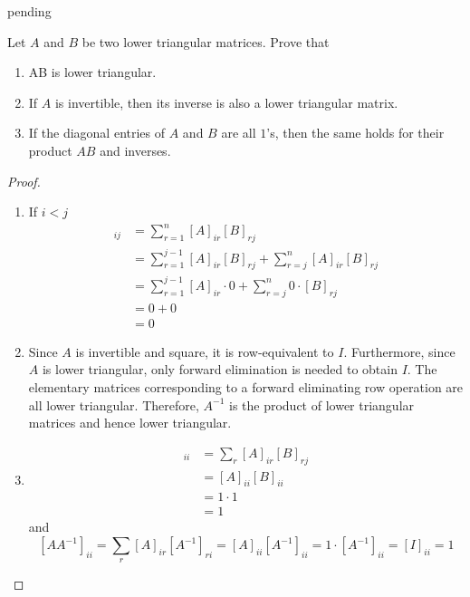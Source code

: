 \begin{problem} \label{P.1.24}
    pending
\end{problem}

\begin{problem} \label{P.1.25}
    Let \( A \) and \( B \) be two lower triangular matrices. Prove that
    \begin{enumerate}
        \item AB is lower triangular.
        
        \item If \( A \) is invertible, then its inverse is also a lower triangular matrix.
        
        \item If the diagonal entries of \( A \) and \( B \) are all \(1\)'s, then the same holds for their product \( AB \) and inverses.
    \end{enumerate}
    
    \begin{proof}
        \begin{enumerate}
            \item If \( i < j \)
            \begin{align*}
                [AB]_{ij} &= \sum_{r=1}^n [A]_{ir}[B]_{rj} \\
                &= \sum_{r=1}^{j-1}[A]_{ir}[B]_{rj} + \sum_{r=j}^n [A]_{ir}[B]_{rj} \\
                &= \sum_{r=1}^{j-1} [A]_{ir}\cdot 0 + \sum_{r=j}^n 0 \cdot [B]_{rj} \\
                &= 0 + 0 \\
                &= 0
            \end{align*}
            
            \item Since \( A \) is invertible and square, it is row-equivalent to \( I \). Furthermore, since \( A \) is lower triangular, only forward elimination is needed to obtain \( I \). The elementary matrices corresponding to a forward eliminating row operation are all lower triangular. Therefore, \( A^{-1} \) is the product of lower triangular matrices and hence lower triangular.
            
            \item
            \begin{align*}
                [AB]_{ii} &= \sum_{r} [A]_{ir}[B]_{rj} \\
                &= [A]_{ii}[B]_{ii} \\
                &= 1 \cdot 1 \\
                &= 1
            \end{align*}
            and
            \[
            [AA^{-1}]_{ii} = \sum_{r}[A]_{ir}[A^{-1}]_{ri} = [A]_{ii}[A^{-1}]_{ii} = 1 \cdot [A^{-1}]_{ii} = [I]_{ii} = 1
            \]
        \end{enumerate}
    \end{proof}
\end{problem}